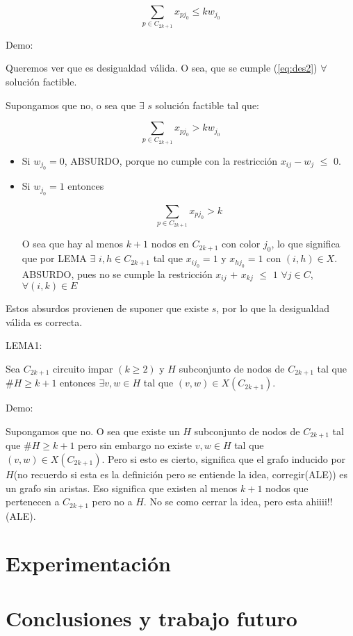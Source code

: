 \documentclass[a4paper]{article}
\begin{document}
\begin{equation} \label{eq:des2}
\sum_{p \in C_{2k+1}} x_{pj_0} \leq kw_{j_0}
\end{equation}

Demo:

Queremos ver que es desigualdad válida. O sea, que se cumple (\ref{eq:des2}) $\forall$ solución factible.

Supongamos que no, o sea que $\exists$ $s$ solución factible tal que:

\begin{equation*}
\sum_{p \in C_{2k+1}} x_{pj_0} > kw_{j_0}
\end{equation*}

\begin{itemize}

	\item Si $w_{j_0} = 0$, ABSURDO, porque no cumple con la restricción $x_{ij} - w_j$ $\leq$ $0$.
	
	\item Si $w_{j_0} = 1$ entonces
	
	\begin{equation*}
	\sum_{p \in C_{2k+1}} x_{pj_0} > k
	\end{equation*}

	O sea que hay al menos $k+1$ nodos en $C_{2k+1}$ con color $j_0$, lo que significa que por LEMA $\exists$ $i,h \in C_{2k+1}$ tal que $x_{ij_0} =1$ y $x_{hj_0} =1$ con $(i,h) \in X$.
	ABSURDO, pues no se cumple la restricción $x_{ij}$ $+$ $x_{kj}$ $\leq$ $1$   $\forall j \in C$, $\forall (i,k) \in E$
\end{itemize}

Estos absurdos provienen de suponer que existe $s$, por lo que la desigualdad válida es correcta.

LEMA1:

Sea $C_{2k+1}$ circuito impar $(k\geq 2)$ y $H$ subconjunto de nodos de $C_{2k+1}$ tal que $\# H \geq k+1$ entonces $\exists v,w \in H$ tal que $(v,w) \in X(C_{2k+1})$.

Demo:

Supongamos que no. O sea que existe un $H$ subconjunto de nodos de $C_{2k+1}$ tal que $\# H \geq k+1$ pero sin embargo no existe $v,w \in H$ tal que $(v,w) \in X(C_{2k+1})$. Pero si esto es cierto, significa que el grafo inducido por $H$(no recuerdo si esta es la definición pero se entiende la idea, corregir(ALE)) es un grafo sin aristas. Eso significa que existen al menos $k+1$ nodos que pertenecen a $C_{2k+1}$ pero no a $H$. No se como cerrar la idea, pero esta ahiiii!!(ALE).


\newpage

\section{Experimentación}

\newpage

\section{Conclusiones y trabajo futuro} 
\end{document}

